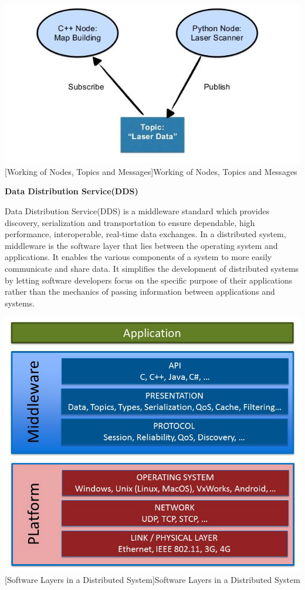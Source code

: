 \documentclass[%
xelatex,
	oneside,		%
	12pt,			%
	parskip=half,	%
	abstracton,
	chapterprefix=true%
    appendixprefix=true]
{scrbook}
\begin{document}
\begin{center}
\includegraphics[scale=0.7]{fig/node_topic.jpg}
[Working of Nodes, Topics and Messages]{Working of Nodes, Topics and Messages\cite{node_topic}}
\label{fig:node}
\end{center}




	{\bfseries Data Distribution Service(DDS)}
	
	
	\vspace*{0.5cm}
	Data Distribution Service(DDS) is a middleware standard which provides discovery, serialization and transportation to ensure dependable, high performance, interoperable, real-time data exchanges.
	In a distributed system, middleware is the software layer that lies between the operating system and applications. It enables the various components of a system to more easily communicate and share data. It simplifies the development of distributed systems by letting software developers focus on the specific purpose of their applications rather than the mechanics of passing information between applications and systems.\cite{DDS}
		
\begin{center}
\includegraphics[scale=0.4]{fig/DDS.jpg}
[Software Layers in a Distributed System]{Software Layers in a Distributed System\cite{DDS}}
\label{fig:DDS}
\end{center}
\end{document}
